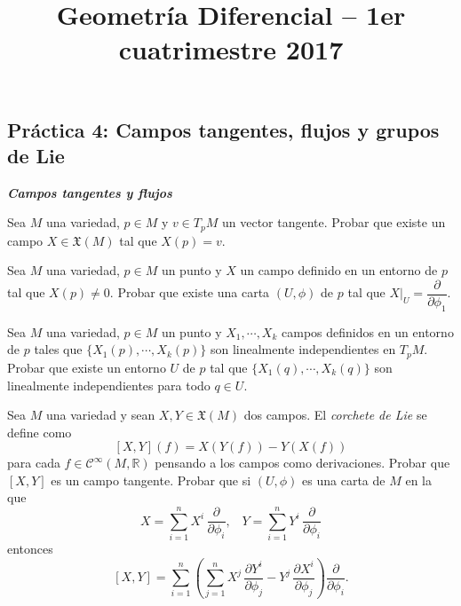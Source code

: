 \documentclass[12pt, a4paper]{amsart}
\theoremstyle{definition}
\newcommand{\RR}{\mathbb{R}}      %
\begin{document}
\title{Geometría Diferencial -- 1er cuatrimestre 2017}
\author{}
\date{}
\nocite{*}
\maketitle
\begin{center}
\section*{Práctica 4: Campos tangentes, flujos y grupos de Lie}
\end{center}
\vspace{1em}
\textsl{\textbf{Campos tangentes y flujos}}
\vspace{1em}

\begin{question}
Sea $M$ una variedad, $p\in M$ y $v\in T_pM$ un vector tangente. Probar que existe un campo $X\in\mathfrak{X}(M)$ tal que $X(p)=v$.
\end{question}

\begin{question}
Sea $M$ una variedad, $p\in M$ un punto y $X$ un campo definido en un entorno de $p$ tal que $X(p)\neq 0$. Probar que existe una carta $(U,\phi)$ de $p$ tal que $\left.X\right|_U = \dfrac{\partial}{\partial\phi_1}$.
\end{question}

\begin{question}
Sea $M$ una variedad, $p\in M$ un punto y $X_1,\cdots,X_k$ campos definidos en un entorno de $p$ tales que $\{X_1(p),\cdots,X_k(p)\}$ son linealmente independientes en $T_pM$. Probar que existe un entorno $U$ de $p$ tal que $\{X_1(q),\cdots,X_k(q)\}$ son linealmente independientes para todo $q\in U$.
\end{question}

\begin{question}
Sea $M$ una variedad y sean $X,Y\in\mathfrak{X}(M)$ dos campos.	El \textit{corchete de Lie} se define como $$[X,Y](f) = X(Y(f)) - Y(X(f))$$ para cada $f\in\mathscr{C}^\infty(M,\RR)$ pensando a los campos como derivaciones. Probar que $[X,Y]$ es un campo tangente. Probar que si $(U,\phi)$ es una carta de $M$ en la que $$X=\displaystyle\sum_{i=1}^n X^i \,\dfrac{\partial}{\partial\phi_i},\;\;\; Y = \displaystyle\sum_{i=1}^n Y^i\, \dfrac{\partial}{\partial\phi_i}$$ entonces $$[X,Y] = \displaystyle\sum_{i=1}^n\left(\displaystyle\sum_{j=1}^n X^j\,\dfrac{\partial Y^i}{\partial\phi_j} - Y^j\,\dfrac{\partial X^i}{\partial\phi_j}\right)\dfrac{\partial}{\partial\phi_i}.$$
\end{question}
\end{document}
